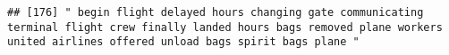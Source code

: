 \documentclass[
]{article}
\begin{document}
\begin{verbatim}
## [176] " begin flight delayed hours changing gate communicating terminal flight crew finally landed hours bags removed plane workers united airlines offered unload bags spirit bags plane "                                                                                                                                                                                                                                                                                                                                                                                                                                                                                                                                                                                                                                                                                                                                                                                                                                                                                                                                                                                                                                                                                                                                                                                                                                                                                                                                                                                                                                                                                                                                                                                                           

\end{verbatim}
\end{document}
